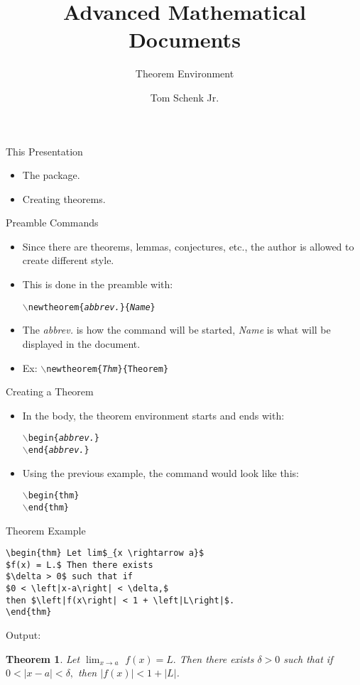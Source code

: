 \documentclass[pdf]{prosper}
\title{Advanced Mathematical Documents}
\subtitle{Theorem Environment}
\author{Tom Schenk Jr.}
\newtheorem{thm}{Theorem}
\begin{document}
\maketitle
\begin{slide}{This Presentation}
	\begin{itemize}
		\item The package.
		\item Creating theorems.
	\end{itemize}
\end{slide}
\begin{slide}{Preamble Commands}
	\begin{itemize}
		\item Since there are theorems, lemmas, conjectures, etc., the author is allowed to create different style.
		\item This is done in the preamble with:
			\begin{center}
				\texttt{$\backslash$newtheorem\{\textit{abbrev.}\}\{\textit{Name}\}}
			\end{center}
		\item The \textit{abbrev.} is how the command will be started, \textit{Name} is what will be displayed in the document.
		\item Ex: \texttt{$\backslash$newtheorem\{\textit{Thm}\}\{Theorem\}}
	\end{itemize}
\end{slide}
\begin{slide}{Creating a Theorem}
	\begin{itemize}
		\item In the body, the theorem environment starts and ends with:
			\begin{center}
				\texttt{$\backslash$begin\{\textit{abbrev.}\}} \\
				\texttt{$\backslash$end\{\textit{abbrev.}\}}
			\end{center}
		\item Using the previous example, the command would look like this:
			\begin{center}
				\texttt{$\backslash$begin\{thm\}} \\
				\texttt{$\backslash$end\{thm\}}
			\end{center}		
	\end{itemize}
\end{slide}
\begin{slide}{Theorem Example}
\begin{verbatim}
\begin{thm} Let lim$_{x \rightarrow a}$ 
$f(x) = L.$ Then there exists 
$\delta > 0$ such that if 
$0 < \left|x-a\right| < \delta,$ 
then $\left|f(x\right| < 1 + \left|L\right|$.
\end{thm}
\end{verbatim}
\smallskip
Output:
\smallskip
\begin{thm} Let $\lim_{x \rightarrow a}$ $f(x) = L.$ Then there exists $\delta > 0$ such that if $0 < \left|x-a\right| < \delta,$ then $\left|f(x)\right| < 1 + \left|L\right|$.
\end{thm}
\end{slide}
\end{document}
